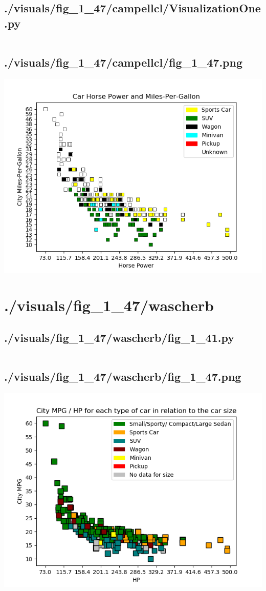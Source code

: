 \documentclass{report}
\begin{document}
    \subsection{./visuals/fig\_1\_47/campellcl/VisualizationOne.py}
    \inputminted{python}{.././visuals/fig_1_47/campellcl/VisualizationOne.py}
    \subsection{./visuals/fig\_1\_47/campellcl/fig\_1\_47.png}
    \includegraphics[width=\textwidth]{.././visuals/fig_1_47/campellcl/fig_1_47.png}
    \pagebreak
    \section{./visuals/fig\_1\_47/wascherb}
    \subsection{./visuals/fig\_1\_47/wascherb/fig\_1\_41.py}
    \inputminted{python}{.././visuals/fig_1_47/wascherb/fig_1_41.py}
    \subsection{./visuals/fig\_1\_47/wascherb/fig\_1\_47.png}
    \includegraphics[width=\textwidth]{.././visuals/fig_1_47/wascherb/fig_1_47.png}
    \pagebreak
\end{document}
